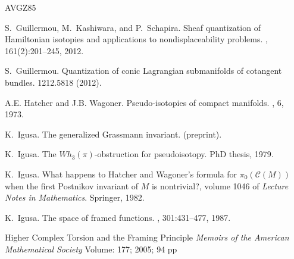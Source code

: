 \documentclass{amsart}
\newcommand\cC{\mathcal{C}}
\theoremstyle{definition}
\theoremstyle{remark}
\newtheorem{inductive lemma}[theorem]{Inductive Lemma}
\begin{document}
\begin{thebibliography}{AVGZ85}




S.~Guillermou, M.~Kashiwara, and P.~Schapira.
\newblock Sheaf quantization of {H}amiltonian isotopies and applications to
  nondisplaceability problems.
, 161(2):201--245, 2012.

S.~Guillermou.
\newblock Quantization of conic Lagrangian submanifolds of cotangent bundles.
  1212.5818 (2012).





A.E. Hatcher and J.B. Wagoner.
\newblock Pseudo-isotopies of compact manifolds.
, 6, 1973.



K.~Igusa.
\newblock The generalized Grassmann invariant.
\newblock (preprint).



K.~Igusa.
\newblock The $Wh_3(\pi)$-obstruction for pseudoisotopy.
\newblock PhD thesis, 1979.

K.~Igusa.
\newblock What happens to Hatcher and Wagoner's formula for
  $\pi_0(\cC(M))$ when the first Postnikov invariant of $M$ is nontrivial?,
  volume 1046 of {\em Lecture Notes in Mathematics}.
\newblock Springer, 1982.

K.~Igusa.
\newblock The space of framed functions.
,
  301:431--477, 1987.
  
  
  Higher Complex Torsion and the Framing Principle
 {\em Memoirs of the American Mathematical Society}
Volume: 177; 2005; 94 pp



\end{thebibliography}
\end{document}
